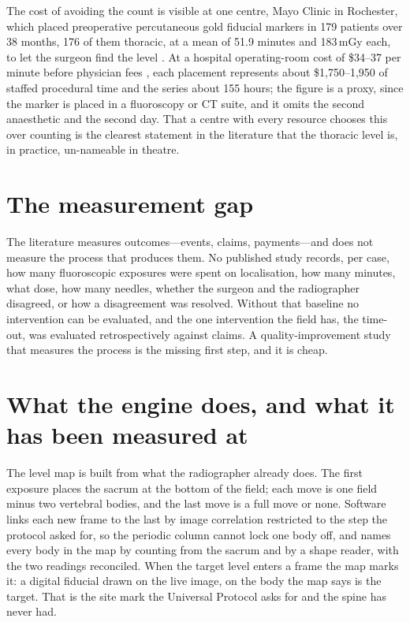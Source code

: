 \documentclass[11pt,letterpaper]{article}
\begin{document}
The cost of avoiding the count is visible at one centre, Mayo Clinic in Rochester, which placed
preoperative percutaneous gold fiducial markers in 179 patients over 38 months, 176 of them thoracic,
at a mean of 51.9 minutes and 183\,mGy each, to let the surgeon find the level \citep{siminski2023}. At a
hospital operating-room cost of \$34--37 per minute before physician fees \citep{childers2018}, each
placement represents about \$1,750--1,950 of staffed procedural time and the series about 155 hours; the
figure is a proxy, since the marker is placed in a fluoroscopy or CT suite, and it omits the second
anaesthetic and the second day. That a centre with every resource chooses this over counting is the
clearest statement in the literature that the thoracic level is, in practice, un-nameable in theatre.

\section*{The measurement gap}
The literature measures outcomes---events, claims, payments---and does not measure the process that
produces them. No published study records, per case, how many fluoroscopic exposures were spent on
localisation, how many minutes, what dose, how many needles, whether the surgeon and the radiographer
disagreed, or how a disagreement was resolved. Without that baseline no intervention can be evaluated,
and the one intervention the field has, the time-out, was evaluated retrospectively against claims. A
quality-improvement study that measures the process is the missing first step, and it is cheap.

\section*{What the engine does, and what it has been measured at}
The level map is built from what the radiographer already does. The first exposure places the sacrum at
the bottom of the field; each move is one field minus two vertebral bodies, and the last move is a full
move or none. Software links each new frame to the last by image correlation restricted to the step the
protocol asked for, so the periodic column cannot lock one body off, and names every body in the map by
counting from the sacrum and by a shape reader, with the two readings reconciled. When the target level
enters a frame the map marks it: a digital fiducial drawn on the live image, on the body the map says is
the target. That is the site mark the Universal Protocol asks for and the spine has never had.
\end{document}
